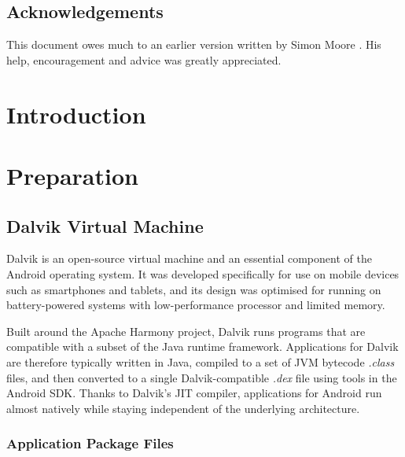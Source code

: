 \documentclass[12pt,twoside,notitlepage]{report}
\begin{document}
\newpage
\section*{Acknowledgements}

This document owes much to an earlier version written by Simon Moore
\cite{moore95}.  His help, encouragement and advice was greatly 
appreciated.


\cleardoublepage        %

\setcounter{page}{1}
\pagestyle{headings}

\chapter{Introduction}


\cleardoublepage
\chapter{Preparation}

\section{Dalvik Virtual Machine}

Dalvik is an open-source virtual machine and an essential component of the Android operating system. It was developed specifically for use on mobile devices such as smartphones and tablets, and its design was optimised for running on battery-powered systems with low-performance processor and limited memory. 

Built around the Apache Harmony project, Dalvik runs programs that are compatible with a subset of the Java runtime framework. Applications for Dalvik are therefore typically written in Java, compiled to a set of JVM bytecode \emph{.class} files, and then converted to a single Dalvik-compatible \emph{.dex} file using tools in the Android SDK. Thanks to Dalvik's JIT compiler, applications for Android run almost natively while staying independent of the underlying architecture.

\subsection{Application Package Files}
\end{document}
